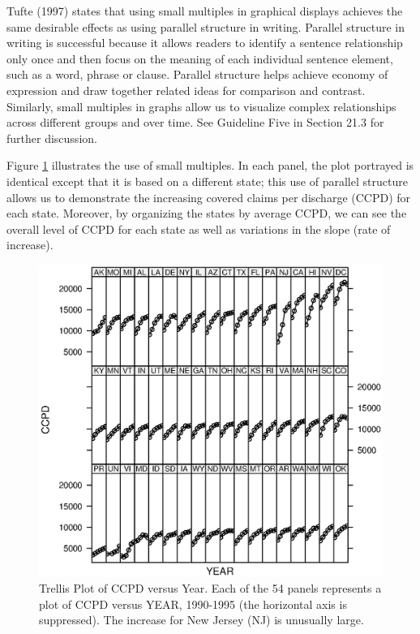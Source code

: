 Tufte (1997) states that using small multiples in graphical displays
achieves the same desirable effects as using parallel structure in
writing. Parallel structure in writing is successful because it
allows readers to identify a sentence relationship only once and
then focus on the meaning of each individual sentence element, such
as a word, phrase or clause. Parallel structure helps achieve
economy of expression and draw together related ideas for comparison
and contrast. Similarly, small multiples in graphs allow us to
visualize complex relationships across different groups and over
time. See Guideline Five in Section 21.3 for further discussion.

Figure \ref{F10:MedicareTrellisPlot} illustrates the use of small
multiples. In each panel, the plot portrayed is identical except
that it is based on a different state; this use of parallel
structure allows us to demonstrate the increasing covered claims per
discharge (CCPD) for each state. Moreover, by organizing the states
by average CCPD, we can see the overall level of CCPD for each state
as well as variations in the slope (rate of increase).

\begin{figure}[htp]
  \begin{center}
    \includegraphics[width=.8\textwidth]
        {Chapter10LongData//F10MedicareTrellisPlot.eps}
    \caption{\label{F10:MedicareTrellisPlot} \small Trellis Plot of CCPD versus Year.
    Each of the 54 panels represents a plot of CCPD versus YEAR, 1990-1995 (the horizontal axis is suppressed).
    The increase for New Jersey (NJ) is unusually large.}
  \end{center}
\end{figure}


